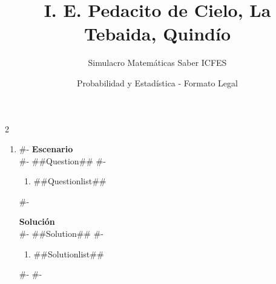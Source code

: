 \documentclass[11pt]{article}
\title{I. E. Pedacito de Cielo, La Tebaida, Quindío}
\author{Simulacro Matemáticas Saber ICFES}
\date{Probabilidad y Estadística - Formato Legal}
\begin{document}
\maketitle

\begin{multicols}{2}

\begin{enumerate}[label=\arabic*.]
#-
  \item
#-
  \textbf{Escenario}\\
#-
  ##Question##
#-
  \begin{enumerate}[label=(\alph*)]
    \item ##Questionlist##
  \end{enumerate}
#-

  \textbf{Solución}\\
#-
  ##Solution##
#-
  \begin{enumerate}[label=(\alph*)]
    \item ##Solutionlist##
  \end{enumerate}
#-
#-
\end{enumerate}

\end{multicols}
\end{document}

